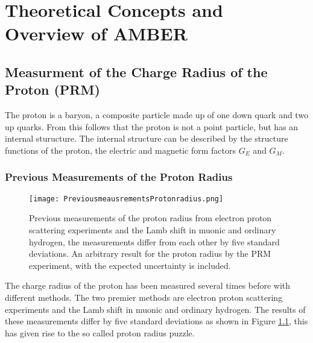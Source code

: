 \chapter{Theoretical Concepts and Overview of AMBER}\label{cha:theory}


\section{Measurment of the Charge Radius of the Proton (PRM)}\label{sec:proton_radius}
The proton is a baryon, a composite particle made up of one down quark and two up quarks.
From this follows that the proton is not a point particle, but has an internal sturucture.\autocite{Workman:2836514}
\newline
The internal structure can be described by the structure functions of the proton, 
the electric and magnetic form factors $G_E$ and $G_M$.\autocite{ProposalAmber}	
\subsection{Previous Measurements of the Proton Radius}
\begin{figure}[h]
	\centering
	\texttt{[image: PreviousmeausrementsProtonradius.png]}
	\caption{Previous measurements of the proton radius from electron proton scattering experiments and the Lamb shift in muonic and ordinary hydrogen,
	 the measurements differ from each other by five standard deviations. An arbitrary result for the proton radius by the PRM experiment, with the expected uncertainty is included.\autocite{ProposalAmber} }
	\label{fig:previous_proton_radius}
\end{figure}

The charge radius of the proton has been measured several times before with different methods.
The two premier methods are electron proton scattering experiments and the Lamb shift in muonic and ordinary hydrogen.
The results of these measurements differ by five standard deviations as shown in Figure \ref{fig:previous_proton_radius},
this has given rise to the so called proton radius puzzle.\autocite{ProposalAmber}

